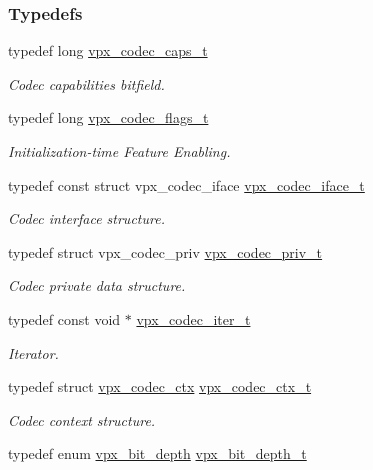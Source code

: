\subsubsection*{Typedefs}
\begin{DoxyCompactItemize}
\item 
typedef long \hyperlink{group__codec_gad2b690c0ef83cbd83a7234078791913f}{vpx\+\_\+codec\+\_\+caps\+\_\+t}
\begin{DoxyCompactList}\small\item\em Codec capabilities bitfield. \end{DoxyCompactList}\item 
typedef long \hyperlink{group__codec_ga3b36d5af89ddc463489fe5bde0a57877}{vpx\+\_\+codec\+\_\+flags\+\_\+t}
\begin{DoxyCompactList}\small\item\em Initialization-\/time Feature Enabling. \end{DoxyCompactList}\item 
typedef const struct vpx\+\_\+codec\+\_\+iface \hyperlink{group__codec_gae99c3b04f4a567a311211cce3ae6b83b}{vpx\+\_\+codec\+\_\+iface\+\_\+t}
\begin{DoxyCompactList}\small\item\em Codec interface structure. \end{DoxyCompactList}\item 
typedef struct vpx\+\_\+codec\+\_\+priv \hyperlink{group__codec_ga1e262f91be9141a7176335fd409397ab}{vpx\+\_\+codec\+\_\+priv\+\_\+t}
\begin{DoxyCompactList}\small\item\em Codec private data structure. \end{DoxyCompactList}\item 
typedef const void $\ast$ \hyperlink{group__codec_ga6ea348f76b1f8a1fe50e14db684146c6}{vpx\+\_\+codec\+\_\+iter\+\_\+t}
\begin{DoxyCompactList}\small\item\em Iterator. \end{DoxyCompactList}\item 
typedef struct \hyperlink{structvpx__codec__ctx}{vpx\+\_\+codec\+\_\+ctx} \hyperlink{group__codec_gad03e2dfa6ae511db7d25be6bbb336233}{vpx\+\_\+codec\+\_\+ctx\+\_\+t}
\begin{DoxyCompactList}\small\item\em Codec context structure. \end{DoxyCompactList}\item 
typedef enum \hyperlink{group__codec_gaeb4bba376f987595b3ad11253adf86d9}{vpx\+\_\+bit\+\_\+depth} \hyperlink{group__codec_ga6272c4d226fe40a57855e4e34737a51b}{vpx\+\_\+bit\+\_\+depth\+\_\+t}\hypertarget{group__codec_ga6272c4d226fe40a57855e4e34737a51b}{}\label{group__codec_ga6272c4d226fe40a57855e4e34737a51b}


\end{DoxyCompactItemize}
